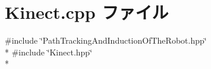 \section{Kinect.\-cpp ファイル}
\label{_kinect_8cpp}
{\ttfamily \#include \char`\"{}Path\-Tracking\-And\-Induction\-Of\-The\-Robot.\-hpp\char`\"{}}\\*
{\ttfamily \#include \char`\"{}Kinect.\-hpp\char`\"{}}\\*
